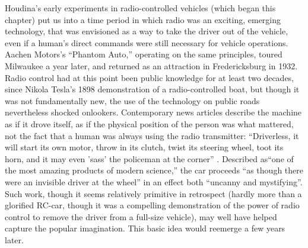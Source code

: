Houdina's early experiments in radio-controlled vehicles (which began
this chapter) put us into a time period in which radio was an
exciting, emerging technology, that was envisioned as a way to take
the driver out of the vehicle, even if a human's direct commands were
still necessary for vehicle operations. Aachen Motors's ``Phantom
Auto,'' operating on the same principles, toured Milwaukee a year
later,\cite{???} and returned as an attraction in Fredericksburg in 1932\cite{???}.
Radio control had at this point been public knowledge for at least two
decades, since Nikola Tesla's 1898 demonstration of a radio-controlled
boat,\cite{???} but though it was not fundamentally new, the use of the
technology on public roads nevertheless shocked onlookers.
Contemporary news articles describe the machine as if it drove itself,
as if the physical position of the person was what mattered, not the
fact that a human was always using the radio transmitter:  ``Driverless,
it will start its own motor, throw in its clutch, twist its steering
wheel, toot its horn, and it may even 'sass' the policeman at the
corner'' \cite{???}. Described as``one of the most amazing products of
modern science,'' the 
car proceeds ``as though there were an invisible driver at the wheel''
in an effect both ``uncanny and mystifying''\cite{???}. Such work,
though it seems relatively primitive in retrospect (hardly more than a
glorified RC-car, though it was a compelling demonstration of the
power of radio control to remove the driver from a full-size vehicle), may well have
helped capture the popular imagination. This basic idea would reemerge
a few years later.

